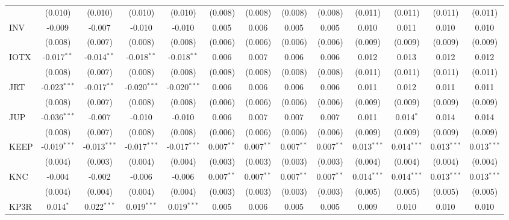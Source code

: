 \begin{table}[!htbp]
\begin{tabular}{@{\extracolsep{5pt}}lcccccccccccc}
  & (0.010) & (0.010) & (0.010) & (0.010) & (0.008) & (0.008) & (0.008) & (0.008) & (0.011) & (0.011) & (0.011) & (0.011) \\
 INV & -0.009$^{}$ & -0.007$^{}$ & -0.010$^{}$ & -0.010$^{}$ & 0.005$^{}$ & 0.006$^{}$ & 0.005$^{}$ & 0.005$^{}$ & 0.010$^{}$ & 0.011$^{}$ & 0.010$^{}$ & 0.010$^{}$ \\
  & (0.008) & (0.007) & (0.008) & (0.008) & (0.006) & (0.006) & (0.006) & (0.006) & (0.009) & (0.009) & (0.009) & (0.009) \\
 IOTX & -0.017$^{**}$ & -0.014$^{**}$ & -0.018$^{**}$ & -0.018$^{**}$ & 0.006$^{}$ & 0.007$^{}$ & 0.006$^{}$ & 0.006$^{}$ & 0.012$^{}$ & 0.013$^{}$ & 0.012$^{}$ & 0.012$^{}$ \\
  & (0.008) & (0.007) & (0.008) & (0.008) & (0.008) & (0.008) & (0.008) & (0.008) & (0.011) & (0.011) & (0.011) & (0.011) \\
 JRT & -0.023$^{***}$ & -0.017$^{**}$ & -0.020$^{***}$ & -0.020$^{***}$ & 0.006$^{}$ & 0.006$^{}$ & 0.006$^{}$ & 0.006$^{}$ & 0.011$^{}$ & 0.012$^{}$ & 0.011$^{}$ & 0.011$^{}$ \\
  & (0.008) & (0.007) & (0.008) & (0.008) & (0.006) & (0.006) & (0.006) & (0.006) & (0.009) & (0.009) & (0.009) & (0.009) \\
 JUP & -0.036$^{***}$ & -0.007$^{}$ & -0.010$^{}$ & -0.010$^{}$ & 0.006$^{}$ & 0.007$^{}$ & 0.007$^{}$ & 0.007$^{}$ & 0.011$^{}$ & 0.014$^{*}$ & 0.014$^{}$ & 0.014$^{}$ \\
  & (0.008) & (0.007) & (0.008) & (0.008) & (0.006) & (0.006) & (0.006) & (0.006) & (0.009) & (0.009) & (0.009) & (0.009) \\
 KEEP & -0.019$^{***}$ & -0.013$^{***}$ & -0.017$^{***}$ & -0.017$^{***}$ & 0.007$^{**}$ & 0.007$^{**}$ & 0.007$^{**}$ & 0.007$^{**}$ & 0.013$^{***}$ & 0.014$^{***}$ & 0.013$^{***}$ & 0.013$^{***}$ \\
  & (0.004) & (0.003) & (0.004) & (0.004) & (0.003) & (0.003) & (0.003) & (0.003) & (0.004) & (0.004) & (0.004) & (0.004) \\
 KNC & -0.004$^{}$ & -0.002$^{}$ & -0.006$^{}$ & -0.006$^{}$ & 0.007$^{**}$ & 0.007$^{**}$ & 0.007$^{**}$ & 0.007$^{**}$ & 0.014$^{***}$ & 0.014$^{***}$ & 0.013$^{***}$ & 0.013$^{***}$ \\
  & (0.004) & (0.004) & (0.004) & (0.004) & (0.003) & (0.003) & (0.003) & (0.003) & (0.005) & (0.005) & (0.005) & (0.005) \\
 KP3R & 0.014$^{*}$ & 0.022$^{***}$ & 0.019$^{***}$ & 0.019$^{***}$ & 0.005$^{}$ & 0.006$^{}$ & 0.005$^{}$ & 0.005$^{}$ & 0.009$^{}$ & 0.010$^{}$ & 0.010$^{}$ & 0.010$^{}$ \\

\end{tabular}
\end{table}
